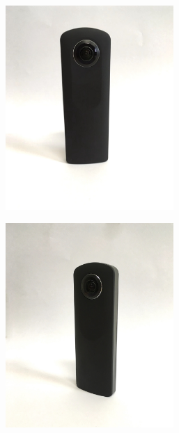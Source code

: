 \begin{figure}
	\centering
	\begin{subfigure}{0.3\textwidth}
		\centering
		\includegraphics[width=0.7\textwidth]{img/theta1}
	\end{subfigure}
	\begin{subfigure}{0.3\textwidth}
		\centering
		\includegraphics[width=0.7\textwidth]{img/theta2}
	\end{subfigure}
	\begin{subfigure}{0.3\textwidth}

\end{subfigure}
\end{figure}
